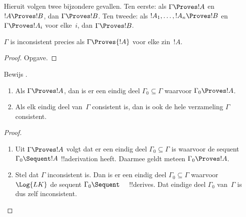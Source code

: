 \documentclass[openany]{memoir}
\begin{document}
Hieruit volgen twee bijzondere gevallen. Ten eerste: als $\Gamma
\Proves !A$ en $!A \Proves !B$, dan $\Gamma \Proves !B$. Ten tweede:
als $!A_1, \dots, !A_n \Proves !B$ en $\Gamma \Proves !A_i$ voor
elke~$i$, dan $\Gamma \Proves !B$.

\begin{prop}
$\Gamma$ is inconsistent precies als $\Gamma \Proves {!A}$ voor elke
zin~$!A$.
\end{prop}

\begin{proof}
Opgave.
\end{proof}

\begin{prob}
Bewijs .
\end{prob}

\begin{prop}[Compactheid]
  \begin{enumerate}
  \item Als $\Gamma \Proves !A$, dan is er een eindig deel $\Gamma_0
    \subseteq \Gamma$ waarvoor $\Gamma_0 \Proves !A$.
  \item Als elk eindig deel van~$\Gamma$ consistent is, dan is ook de
    hele verzameling $\Gamma$ consistent.
  \end{enumerate}
\end{prop}

\begin{proof}
  \begin{enumerate}
    \item Uit $\Gamma \Proves !A$ volgt dat er een eindig deel
      $\Gamma_0 \subseteq \Gamma$ is waarvoor de sequent $\Gamma_0
      \Sequent !A$ !!a{derivation} heeft. Daarmee geldt meteen
      $\Gamma_0 \Proves !A$.
    \item Stel dat $\Gamma$ inconsistent is. Dan is er een eindig deel
      $\Gamma_0 \subseteq \Gamma$ waarvoor $\Log{LK}$ de sequent
      $\Gamma_0 \Sequent \quad$ !!{derive}s. Dat eindige deel
      $\Gamma_0$ van~$\Gamma$ is dus zelf inconsistent.
  \end{enumerate}
\end{proof}
\endgroup

\begingroup
\def\olfilename{OLP-0078}
\def\olfilepath{content/first-order-logic/sequent-calculus/}
\hypertarget{unit-OLP-0078}{}
\end{document}
